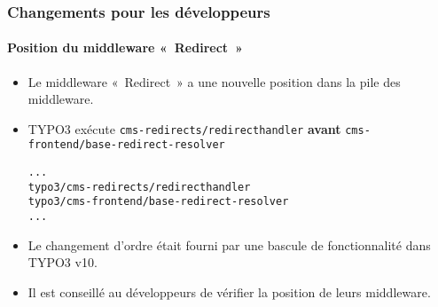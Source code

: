 %

\begin{frame}[fragile]
	\frametitle{Changements pour les développeurs}
	\framesubtitle{Position du middleware «~Redirect~»}

	\lstset{basicstyle=\tiny\ttfamily}

	\begin{itemize}
		\item Le middleware «~Redirect~» a une nouvelle position dans la pile des middleware.
		\item TYPO3 exécute
			\small\texttt{cms-redirects/redirecthandler}\normalsize\newline
			\textbf{avant}
			\texttt{cms-frontend/base-redirect-resolver}\normalsize
\begin{lstlisting}
...
typo3/cms-redirects/redirecthandler
typo3/cms-frontend/base-redirect-resolver
...
\end{lstlisting}

		\item Le changement d'ordre était fourni par une bascule de fonctionnalité dans TYPO3 v10.
		\item Il est conseillé au développeurs de vérifier la position de leurs middleware.

	\end{itemize}

\end{frame}

